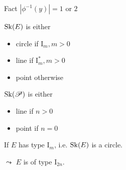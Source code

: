 \begin{frame}[t]
	\begin{minipage}[t]{.7\textwidth}
		
		\begin{block}{Fact}
			$|\phi^{-1}(y)| = 1 \text{ or } 2$
		\end{block}
		\begin{minipage}[t]{.49\textwidth}
			$\operatorname{Sk}(E)$ is either
			\begin{itemize}
				\item circle if $\mathrm I_m, m >0$
				\item line if $\mathrm I_{m}^*, m > 0$
				\item point otherwise
			\end{itemize}
		\end{minipage}
		\begin{minipage}[t]{.49\textwidth}
			$\operatorname{Sk}(\mathscr P)$ is either
			\begin{itemize}
				\item line if $n > 0$ 
				\item point if $n = 0$
			\end{itemize}
		\end{minipage}
		
	\end{minipage}
	\begin{minipage}[t]{.29\textwidth}
	\end{minipage}
\end{frame}
\begin{frame}
	If $E$ has type $\mathrm I_m$, i.e. $\operatorname{Sk}(E)$ is a circle.
	\begin{figure}
	\end{figure}
	\pause
    $\leadsto$ $E$ is of type $\mathrm I_{2n}$.
\end{frame}

